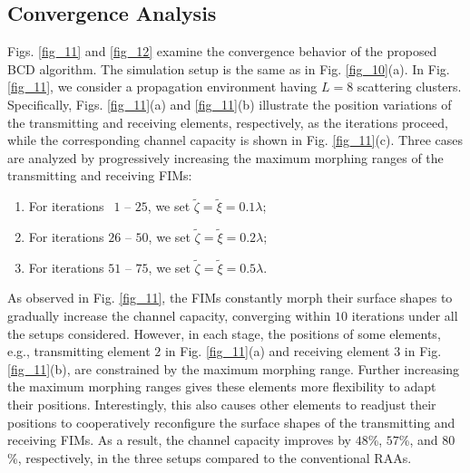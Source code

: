 \documentclass[lettersize,journal]{IEEEtran}
\begin{document}
\subsection{Convergence Analysis}\label{sec65}
Figs. \ref{fig_11} and \ref{fig_12} examine the convergence behavior of the proposed BCD algorithm. The simulation setup is the same as in Fig. \ref{fig_10}(a). In Fig. \ref{fig_11}, we consider a propagation environment having $L = 8$ scattering clusters. Specifically, Figs. \ref{fig_11}(a) and \ref{fig_11}(b) illustrate the position variations of the transmitting and receiving elements, respectively, as the iterations proceed, while the corresponding channel capacity is shown in Fig. \ref{fig_11}(c). Three cases are analyzed by progressively increasing the maximum morphing ranges of the transmitting and receiving FIMs:
\begin{enumerate}[label = (\roman*)]
 \item For iterations $\,\; 1$ -- $25$, we set $\tilde \zeta = \tilde \xi = 0.1 \lambda$;
 \item For iterations $26$ -- $50$, we set $\tilde \zeta = \tilde \xi = 0.2 \lambda$;
 \item For iterations $51$ -- $75$, we set $\tilde \zeta = \tilde \xi = 0.5\lambda$.
\end{enumerate}
As observed in Fig. \ref{fig_11}, the FIMs constantly morph their surface shapes to gradually increase the channel capacity, converging within $10$ iterations under all the setups considered. However, in each stage, the positions of some elements, e.g., transmitting element $2$ in Fig. \ref{fig_11}(a) and receiving element $3$ in Fig. \ref{fig_11}(b), are constrained by the maximum morphing range. Further increasing the maximum morphing ranges gives these elements more flexibility to adapt their positions. Interestingly, this also causes other elements to readjust their positions to cooperatively reconfigure the surface shapes of the transmitting and receiving FIMs. As a result, the channel capacity improves by $48$\%, $57$\%, and $80$\%, respectively, in the three setups compared to the conventional RAAs.
\end{document}

